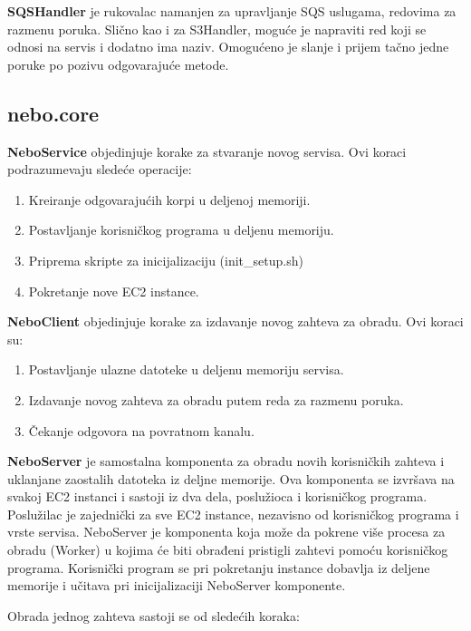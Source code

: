 \documentclass[a4paper]{article}
\begin{document}
{\bf SQSHandler} je rukovalac namanjen za upravljanje SQS uslugama, redovima za
razmenu poruka. Slično kao i za S3Handler, moguće je napraviti red koji se
odnosi na servis i dodatno ima naziv. Omogućeno je slanje i prijem tačno jedne
poruke po pozivu odgovarajuće metode.

\subsection{nebo.core}

{\bf NeboService} objedinjuje korake za stvaranje novog servisa. Ovi koraci
podrazumevaju sledeće operacije:

\begin{enumerate}
\item Kreiranje odgovarajućih korpi u deljenoj memoriji.
\item Postavljanje korisničkog programa u deljenu memoriju.
\item Priprema skripte za inicijalizaciju (init\_setup.sh)
\item Pokretanje nove EC2 instance.
\end{enumerate}

{\bf NeboClient} objedinjuje korake za izdavanje novog zahteva za obradu. Ovi
koraci su:

\begin{enumerate}
\item Postavljanje ulazne datoteke u deljenu memoriju servisa.
\item Izdavanje novog zahteva za obradu putem reda za razmenu poruka.
\item Čekanje odgovora na povratnom kanalu.
\end{enumerate}

{\bf NeboServer} je samostalna komponenta za obradu novih korisničkih zahteva i
uklanjane zaostalih datoteka iz deljne memorije. Ova komponenta se izvršava na
svakoj EC2 instanci i sastoji iz dva dela, poslužioca i korisničkog programa.
Poslužilac je zajednički za sve EC2 instance, nezavisno od korisničkog programa
i vrste servisa. NeboServer je komponenta koja može da pokrene više procesa za
obradu (Worker) u kojima će biti obrađeni pristigli zahtevi pomoću korisničkog
programa. Korisnički program se pri pokretanju instance dobavlja iz deljene
memorije i učitava pri inicijalizaciji NeboServer komponente.

Obrada jednog zahteva sastoji se od sledećih koraka:
\end{document}
